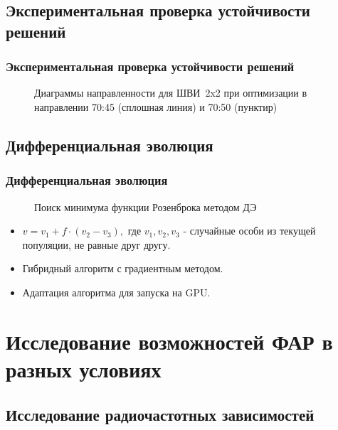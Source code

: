 \subsection{Экспериментальная проверка устойчивости решений}
\begin{frame}
    \frametitle{Экспериментальная проверка устойчивости решений}
    \begin{figure}[h]
    \centering
    \vspace{0.7em}
    \caption{Диаграммы направленности для ШВИ~2x2 при оптимизации в направлении 70:45 (сплошная линия) и 70:50 (пунктир)}
    \label{ris:bve_comp}
    \end{figure}
\end{frame}


\subsection{Дифференциальная эволюция}
\begin{frame}
    \frametitle{Дифференциальная эволюция}
    \begin{figure}
    \caption{Поиск минимума функции Розенброка методом ДЭ}
    \label{ris:rosenbroke}
    \end{figure}
    \begin{itemize}
      \item $v=v_{1}+f\cdot (v_{2}-v_{3}),$
            где $v_1, v_2, v_3$ - случайные особи из текущей популяции, не равные друг другу.
      \item Гибридный алгоритм с градиентным методом.
      \item Адаптация алгоритма для запуска на GPU.
    \end{itemize}
\end{frame}


\section{Исследование возможностей ФАР в разных условиях}
\subsection{Исследование радиочастотных зависимостей}

